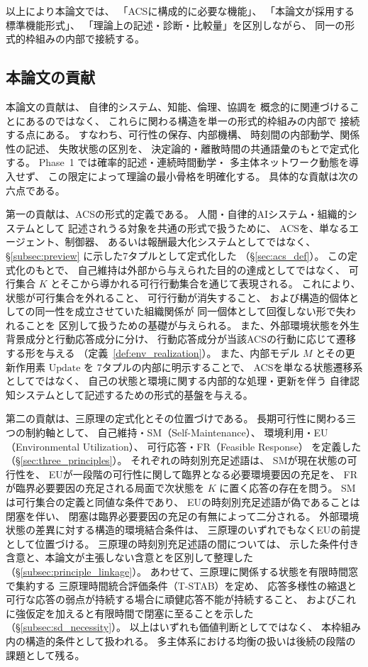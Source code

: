 以上により本論文では、
「ACSに構成的に必要な機能」、
「本論文が採用する標準機能形式」、
「理論上の記述・診断・比較量」を区別しながら、
同一の形式的枠組みの内部で接続する。

\subsection{本論文の貢献}
\label{subsec:contributions}

本論文の貢献は、
自律的システム、知能、倫理、協調を
概念的に関連づけることにあるのではなく、
これらに関わる構造を単一の形式的枠組みの内部で
接続する点にある。
すなわち、可行性の保存、内部機構、
時刻間の内部動学、関係性の記述、
失敗状態の区別を、
決定論的・離散時間の共通語彙のもとで定式化する。
Phase~1 では確率的記述・連続時間動学・
多主体ネットワーク動態を導入せず、
この限定によって理論の最小骨格を明確化する。
具体的な貢献は次の六点である。

第一の貢献は、ACSの形式的定義である。
人間・自律的AIシステム・組織的システムとして
記述されうる対象を共通の形式で扱うために、
ACSを、単なるエージェント、制御器、
あるいは報酬最大化システムとしてではなく、
\S\ref{subsec:preview} に示した7タプルとして定式化した
（\S\ref{sec:acs_def}）。
この定式化のもとで、
自己維持は外部から与えられた目的の達成としてではなく、
可行集合 $K$ とそこから導かれる可行行動集合を通じて表現される。
これにより、
状態が可行集合を外れること、
可行行動が消失すること、
および構造的個体としての同一性を成立させていた組織関係が
同一個体として回復しない形で失われることを
区別して扱うための基礎が与えられる。
また、外部環境状態を外生背景成分と行動応答成分に分け、
行動応答成分が当該ACSの行動に応じて遷移する形を与える
（定義~\ref{def:env_realization}）。
また、内部モデル $M$ とその更新作用素 $\mathrm{Update}$ を
7タプルの内部に明示することで、
ACSを単なる状態遷移系としてではなく、
自己の状態と環境に関する内部的な処理・更新を伴う
自律認知システムとして記述するための形式的基盤を与える。

第二の貢献は、三原理の定式化とその位置づけである。
長期可行性に関わる三つの制約軸として、
自己維持・SM（Self-Maintenance）、
環境利用・EU（Environmental Utilization）、
可行応答・FR（Feasible Response）
を定義した（\S\ref{sec:three_principles}）。
それぞれの時刻別充足述語は、
SMが現在状態の可行性を、
EUが一段階の可行性に関して臨界となる必要環境要因の充足を、
FRが臨界必要要因の充足される局面で次状態を $K$ に置く応答の存在を問う。
SMは可行集合の定義と同値な条件であり、
EUの時刻別充足述語が偽であることは閉塞を伴い、
閉塞は臨界必要要因の充足の有無によって二分される。
外部環境状態の差異に対する構造的環境結合条件は、
三原理のいずれでもなくEUの前提として位置づける。
三原理の時刻別充足述語の間については、
示した条件付き含意と、本論文が主張しない含意とを区別して整理した
（\S\ref{subsec:principle_linkage}）。
あわせて、三原理に関係する状態を有限時間窓で集約する
三原理時間統合評価条件（T-STAB）を定め、
応答多様性の縮退と可行な応答の弱点が持続する場合に頑健応答不能が持続すること、
およびこれに強仮定を加えると有限時間で閉塞に至ることを示した
（\S\ref{subsec:sd_necessity}）。
以上はいずれも価値判断としてではなく、
本枠組み内の構造的条件として扱われる。
多主体系における均衡の扱いは後続の段階の課題として残る。

